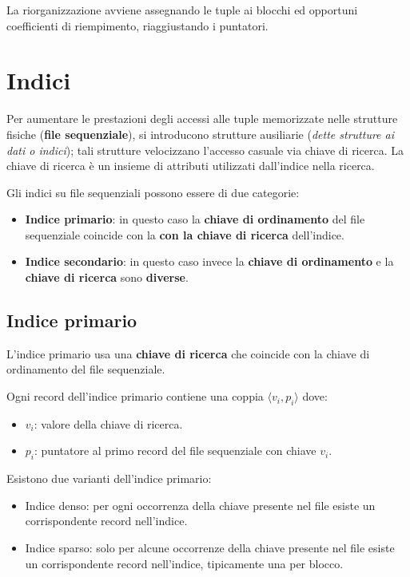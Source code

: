 \documentclass[oneside,a4paper,11pt]{book}
\theoremstyle{italicstyle}
\theoremstyle{normStyle}
\begin{document}
La riorganizzazione avviene assegnando le tuple ai blocchi ed opportuni coefficienti 
di riempimento, riaggiustando i puntatori.
\section{Indici}
Per aumentare le prestazioni degli accessi alle tuple memorizzate nelle strutture fisiche 
(\textbf{file sequenziale}), si introducono strutture ausiliarie (\textit{dette 
strutture ai dati o indici}); tali strutture velocizzano l'accesso casuale via chiave di ricerca.
La chiave di ricerca è un insieme di attributi utilizzati dall'indice nella ricerca.

Gli indici su file sequenziali possono essere di due categorie:
\begin{itemize}
    \item \textbf{Indice primario}: in questo caso la \textbf{chiave di ordinamento} del file 
    sequenziale coincide con la \textbf{con la chiave di ricerca} dell'indice.
    \item \textbf{Indice secondario}: in questo caso invece la \textbf{chiave di 
    ordinamento} e la \textbf{chiave di ricerca} sono \textbf{diverse}.
\end{itemize}
\subsection{Indice primario}
L'indice primario usa una \textbf{chiave di ricerca} che coincide con la chiave di 
ordinamento del file sequenziale.

Ogni record dell'indice primario contiene una coppia $\langle v_i, p_i\rangle$ dove:
\begin{itemize}
    \item $v_i$: valore della chiave di ricerca.
    \item $p_i$: puntatore al primo record del file sequenziale con chiave $v_i$.
\end{itemize}
Esistono due varianti dell'indice primario:
\begin{itemize}
    \item Indice denso: per ogni occorrenza della chiave presente nel file esiste 
    un corrispondente record nell'indice.
    \item Indice sparso: solo per alcune occorrenze della chiave presente nel file 
    esiste un corrispondente record nell'indice, tipicamente una per blocco.
\end{itemize}
\end{document}
